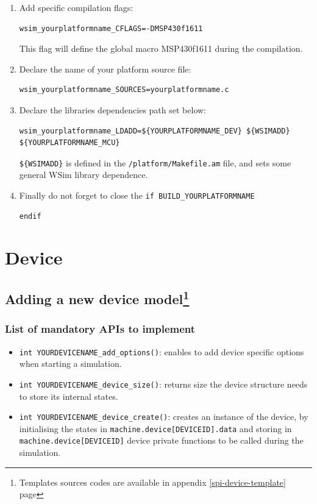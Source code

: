 \documentclass[a4paper,10pt]{report}
\begin{document}
\begin{enumerate}
  \item Add specific compilation flags:
\begin{verbatim}
wsim_yourplatformname_CFLAGS=-DMSP430f1611
\end{verbatim}
This flag will define the global macro MSP430f1611 during the compilation.

  \item Declare the name of your platform source file:
\begin{verbatim}
wsim_yourplatformname_SOURCES=yourplatformname.c
\end{verbatim}

  \item Declare the libraries dependencies path set below: 
\begin{verbatim}
wsim_yourplatformname_LDADD=${YOURPLATFORMNAME_DEV} ${WSIMADD} ${YOURPLATFORMNAME_MCU}
\end{verbatim}
\verb!${WSIMADD}! is defined in the \verb$/platform/Makefile.am$ file, and sets some general WSim library dependence.

  \item  Finally do not forget to close the \verb$if BUILD_YOURPLATFORMNAME$
\begin{verbatim}
endif
\end{verbatim}

\end{enumerate}

\section{Device}
\subsection[Adding a new device model]{Adding a new device model\protect\footnote{Templates sources codes are available in appendix \ref{spi-device-template} page \pageref{spi-device-template}}} 
\label{adding-device}
\subsubsection{List of mandatory APIs to implement}
\begin{itemize}
  \item \verb$int YOURDEVICENAME_add_options()$: enables to add device specific options when starting a simulation.
  \item \verb$int YOURDEVICENAME_device_size()$: returns size the device structure needs to store its internal states.
  \item \verb$int YOURDEVICENAME_device_create()$: creates an instance of the device, by initialising the states in \verb$machine.device[DEVICEID].data$ and storing in \verb$machine.device[DEVICEID]$ device private functions to be called during the simulation.
\end{itemize}
\end{document}
